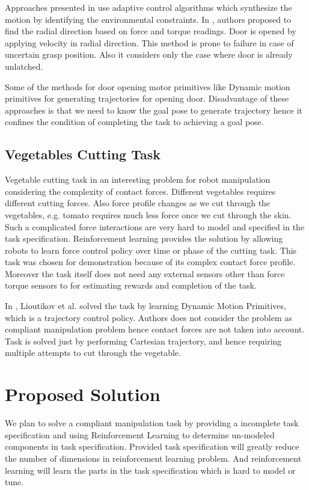 \documentclass[thesis]{mas_proposal}
\begin{document}
Approaches presented in \cite{levihn2014using,karayiannidis2012adaptive,niemeyer1997simple} use adaptive control algorithms which synthesize the motion by identifying the environmental constraints. In \cite{karayiannidis2012adaptive}, authors proposed to find the radial direction based on force and torque readings. Door is opened by applying velocity in radial direction. This method is prone to failure in case of uncertain grasp position. Also it considers only the case where door is already unlatched. 

Some of the methods for door opening motor primitives like Dynamic motion primitives for generating trajectories for opening door. Disadvantage of these approaches is that we need to know the goal pose to generate trajectory hence it confines the condition of completing the task to achieving a goal pose. 

\section{Vegetables Cutting Task}
Vegetable cutting task in an interesting problem for robot manipulation considering the complexity of contact forces. Different vegetables requires different cutting forces. Also force profile changes as we cut through the vegetables, e.g. tomato requires much less force once we cut through the skin. Such a complicated force interactions are very hard to model and specified in the task specification. Reinforcement learning provides the solution by allowing robots to learn force control policy over time or phase of the cutting task. This task was chosen for demonstration because of its complex contact force profile. Moreover the task itself does not need any external sensors other than force torque sensors to for estimating rewards and completion of the task.

In \cite{lioutikov2016learning}, Lioutikov et al. solved the task by learning Dynamic Motion Primitives, which is a trajectory control policy. Authors does not consider the problem as compliant manipulation problem hence contact forces are not taken into account. Task is solved just by performing Cartesian trajectory, and hence requiring multiple attempts to cut through the vegetable. 


\chapter{Proposed Solution}

We plan to solve a compliant manipulation task by providing a incomplete task specification and using Reinforcement Learning to determine un-modeled components in task specification. Provided task specification will greatly reduce the number of dimensions in reinforcement learning problem. And reinforcement learning will learn the parts in the task specification which is hard to model or tune.
\end{document}
